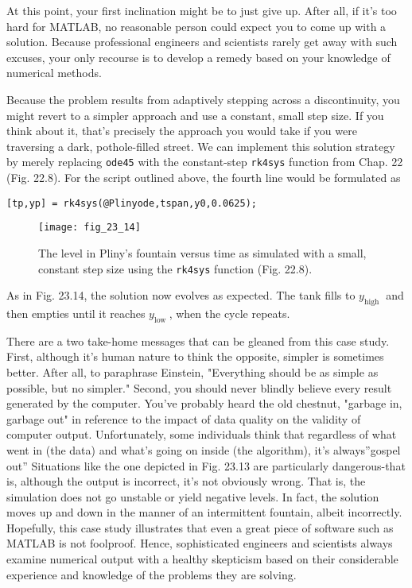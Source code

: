 \documentclass[../main.tex]{subfiles}
\begin{document}
At this point, your first inclination might be to just give up. After all, if it's too hard for
MATLAB, no reasonable person could expect you to come up with a solution. Because
professional engineers and scientists rarely get away with such excuses, your only recourse
is to develop a remedy based on your knowledge of numerical methods.

Because the problem results from adaptively stepping across a discontinuity, you
might revert to a simpler approach and use a constant, small step size. If you think about it,
that's precisely the approach you would take if you were traversing a dark, pothole-filled
street. We can implement this solution strategy by merely replacing \texttt{ode45} with the
constant-step \texttt{rk4sys} function from Chap. 22 (Fig. 22.8). For the script outlined above, the
fourth line would be formulated as

\texttt{[tp,yp] = rk4sys(@Plinyode,tspan,y0,0.0625);}

\begin{figure}[H]
    \centering
    \texttt{[image: fig\_23\_14]}
   \caption{\textsf{The level in Pliny's fountain versus time as simulated with a small, constant step size using the
   \texttt{rk4sys} function (Fig. 22.8).}}\label{fig:fig_23_14}
\end{figure}

\noindent As in Fig. 23.14, the solution now evolves as expected. The tank fills to $y_{\text {high }}$ and then empties until it reaches $y_{\text {low }}$, when the cycle repeats.

There are a two take-home messages that can be gleaned from this case study. First, although it's human nature to think the opposite, simpler is sometimes better. After all, to paraphrase Einstein, "Everything should be as simple as possible, but no simpler." Second, you should never blindly believe every result generated by the computer.
You've probably heard the old chestnut, "garbage in, garbage out" in reference to the impact of data quality on the validity of computer output. Unfortunately, some individuals think that regardless of
what went in (the data) and what's going on inside (the algorithm), it's always''gospel out''
Situations like the one depicted in Fig. 23.13 are particularly dangerous-that is, although
the output is incorrect, it's not obviously wrong. That is, the simulation does not go unstable or yield negative levels. In fact, the solution moves up and down in the manner of an
intermittent fountain, albeit incorrectly.
Hopefully, this case study illustrates that even a great piece of software such as
MATLAB is not foolproof. Hence, sophisticated engineers and scientists always examine
numerical output with a healthy skepticism based on their considerable experience and
knowledge of the problems they are solving.
\vspace{5mm}
\end{document}
